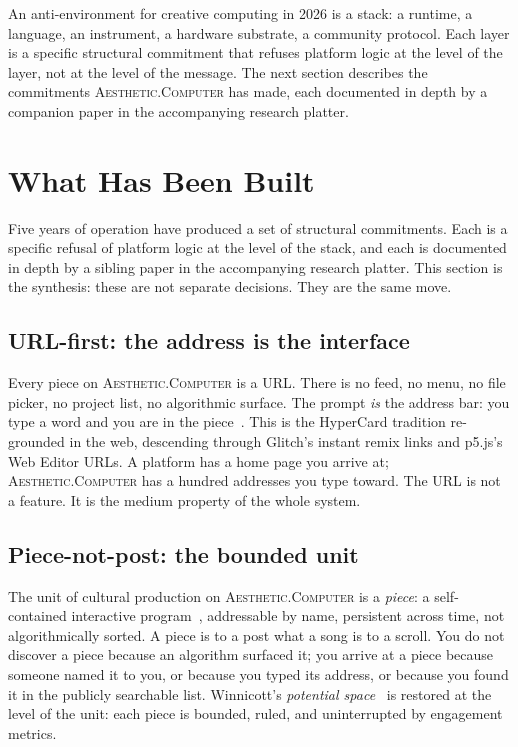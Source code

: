 \documentclass[10pt,letterpaper,twocolumn]{article}
\newcommand{\ac}{\textsc{Aesthetic.Computer}}
\begin{document}
An anti-environment for creative computing in 2026 is a stack: a runtime, a language, an instrument, a hardware substrate, a community protocol. Each layer is a specific structural commitment that refuses platform logic at the level of the layer, not at the level of the message. The next section describes the commitments \ac{} has made, each documented in depth by a companion paper in the accompanying research platter.

\section{What Has Been Built}

Five years of operation have produced a set of structural commitments. Each is a specific refusal of platform logic at the level of the stack, and each is documented in depth by a sibling paper in the accompanying research platter. This section is the synthesis: these are not separate decisions. They are the same move.

\subsection{URL-first: the address is the interface}

Every piece on \ac{} is a URL. There is no feed, no menu, no file picker, no project list, no algorithmic surface. The prompt \emph{is} the address bar: you type a word and you are in the piece~\citep{scudder2026urltradition}. This is the HyperCard tradition re-grounded in the web, descending through Glitch's instant remix links and p5.js's Web Editor URLs. A platform has a home page you arrive at; \ac{} has a hundred addresses you type toward. The URL is not a feature. It is the medium property of the whole system.

\subsection{Piece-not-post: the bounded unit}

The unit of cultural production on \ac{} is a \emph{piece}: a self-contained interactive program~\citep{scudder2026pieces}, addressable by name, persistent across time, not algorithmically sorted. A piece is to a post what a song is to a scroll. You do not discover a piece because an algorithm surfaced it; you arrive at a piece because someone named it to you, or because you typed its address, or because you found it in the publicly searchable list. Winnicott's \emph{potential space}~\citep{winnicott1971playing} is restored at the level of the unit: each piece is bounded, ruled, and uninterrupted by engagement metrics.
\end{document}
